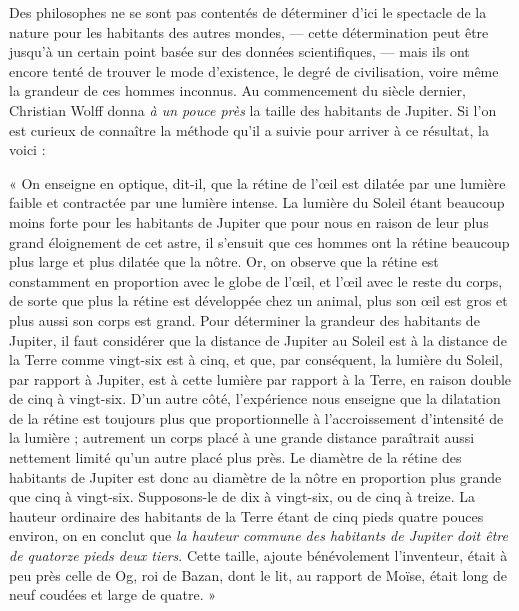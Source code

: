 \documentclass[a4paper, 11pt, oneside, landscape]{article}
\begin{document}
Des philosophes ne se sont pas contentés de déterminer d'ici le spectacle de la nature pour les habitants des autres mondes, --- cette détermination peut être jusqu'à un certain point basée sur des données scientifiques, --- mais ils ont encore tenté de trouver le mode d'existence, le degré de civilisation, voire même la grandeur de ces hommes inconnus. Au commencement du siècle dernier, Christian Wolff donna \emph{à un pouce près} la taille des habitants de Jupiter. Si l'on est curieux de connaître la méthode qu'il a suivie pour arriver à ce résultat, la voici :

« On enseigne en optique, dit-il, que la rétine de l'œil est dilatée par une lumière faible et contractée par une lumière intense. La lumière du Soleil étant beaucoup moins forte pour les habitants de Jupiter que pour nous en raison de leur plus grand éloignement de cet astre, il s'ensuit que ces hommes ont la rétine beaucoup plus large et plus dilatée que la nôtre. Or, on observe que la rétine est constamment en proportion avec le globe de l'œil, et l'œil avec le reste du corps, de sorte que plus la rétine est développée chez un animal, plus son œil est gros et plus aussi son corps est grand. Pour déterminer la grandeur des habitants de Jupiter, il faut considérer que la distance de Jupiter au Soleil est à la distance de la Terre comme vingt-six est à cinq, et que, par conséquent, la lumière du Soleil, par rapport à Jupiter, est à cette lumière par rapport à la Terre, en raison double de cinq à vingt-six. D'un autre côté, l'expérience nous enseigne que la dilatation de la rétine est toujours plus que proportionnelle à l'accroissement d'intensité de la lumière ; autrement un corps placé à une grande distance paraîtrait aussi nettement limité qu'un autre placé plus près. Le diamètre de la rétine des habitants de Jupiter est donc au diamètre de la nôtre en proportion plus grande que cinq à vingt-six. Supposons-le de dix à vingt-six, ou de cinq à treize. La hauteur ordinaire des habitants de la Terre étant de cinq pieds quatre pouces environ, on en conclut que \emph{la hauteur commune des habitants de Jupiter doit être de quatorze pieds deux tiers}. Cette taille, ajoute bénévolement l'inventeur, était à peu près celle de Og, roi de Bazan, dont le lit, au rapport de Moïse, était long de neuf coudées et large de quatre. »
\end{document}
